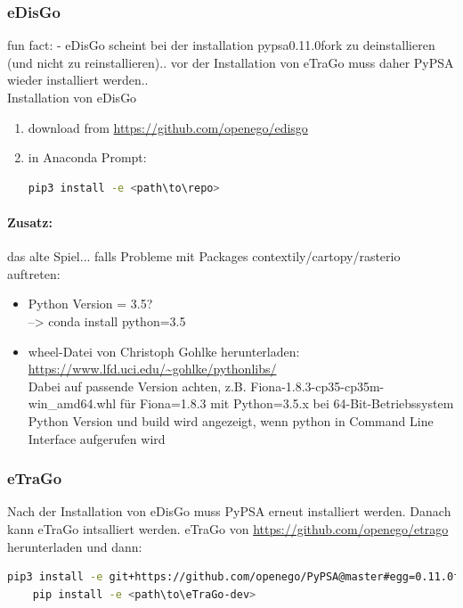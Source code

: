 \documentclass[
a4paper,     %
12pt         %
]{scrartcl}  %
\begin{document}
\subsubsection{eDisGo}
fun fact: - eDisGo scheint bei der installation pypsa0.11.0fork zu deinstallieren (und nicht zu reinstallieren).. vor der Installation von eTraGo muss daher PyPSA wieder installiert werden..\\

Installation von eDisGo
\begin{enumerate}
	\item download from \url{https://github.com/openego/edisgo}\\
	\item in Anaconda Prompt:
	\begin{lstlisting}[language=bash]
		pip3 install -e <path\to\repo>
	\end{lstlisting}
\end{enumerate}

\paragraph{Zusatz:} das alte Spiel... falls Probleme mit Packages contextily/cartopy/rasterio auftreten:

\begin{itemize}
	\item Python Version = 3.5?
	\\--> conda install python=3.5
	\item wheel-Datei von Christoph Gohlke herunterladen: \url{https://www.lfd.uci.edu/~gohlke/pythonlibs/}\\
	Dabei auf passende Version achten, z.B. Fiona-1.8.3-cp35-cp35m-win\_amd64.whl für Fiona=1.8.3 mit Python=3.5.x bei 64-Bit-Betriebssystem\\
	Python Version und build wird angezeigt, wenn python in Command Line Interface aufgerufen wird
\end{itemize}

\subsubsection{eTraGo}
Nach der Installation von eDisGo muss PyPSA erneut installiert werden. Danach kann eTraGo intsalliert werden. eTraGo von \url{https://github.com/openego/etrago} herunterladen und dann:
\begin{lstlisting}[language=bash]
	pip3 install -e git+https://github.com/openego/PyPSA@master#egg=0.11.0fork
	pip install -e <path\to\eTraGo-dev>
\end{lstlisting}
\end{document}
